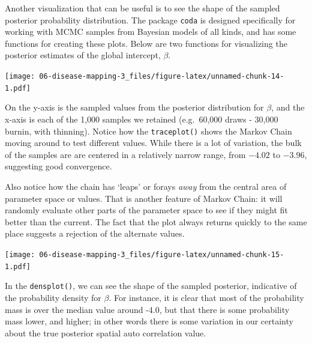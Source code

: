 \documentclass[
]{book}
\newenvironment{Shaded}{\begin{snugshade}}{\end{snugshade}}
\newcommand{\FunctionTok}[1]{\textcolor[rgb]{0.13,0.29,0.53}{\textbf{#1}}}
\newcommand{\NormalTok}[1]{#1}
\newcommand{\SpecialCharTok}[1]{\textcolor[rgb]{0.81,0.36,0.00}{\textbf{#1}}}
\begin{document}
Another visualization that can be useful is to see the shape of the sampled posterior probability distribution. The package \texttt{coda} is designed specifically for working with MCMC samples from Bayesian models of all kinds, and has some functions for creating these plots. Below are two functions for visualizing the posterior estimates of the global intercept, \(\beta\).

\begin{Shaded}
\end{Shaded}

\texttt{[image: 06-disease-mapping-3\_files/figure-latex/unnamed-chunk-14-1.pdf]}

On the y-axis is the sampled values from the posterior distribution for \(\beta\), and the x-axis is each of the 1,000 samples we retained (e.g.~60,000 draws - 30,000 burnin, with thinning). Notice how the \texttt{traceplot()} shows the Markov Chain moving around to test different values. While there is a lot of variation, the bulk of the samples are are centered in a relatively narrow range, from \(-4.02\) to \(-3.96\), suggesting good convergence.

Also notice how the chain has `leaps' or forays \emph{away} from the central area of parameter space or values. That is another feature of Markov Chain: it will randomly evaluate other parts of the parameter space to see if they might fit better than the current. The fact that the plot always returns quickly to the same place suggests a rejection of the alternate values.

\begin{Shaded}
\end{Shaded}

\texttt{[image: 06-disease-mapping-3\_files/figure-latex/unnamed-chunk-15-1.pdf]}

In the \texttt{densplot()}, we can see the shape of the sampled posterior, indicative of the probability density for \(\beta\). For instance, it is clear that most of the probability mass is over the median value around -4.0, but that there is some probability mass lower, and higher; in other words there is some variation in our certainty about the true posterior spatial auto correlation value.
\end{document}
